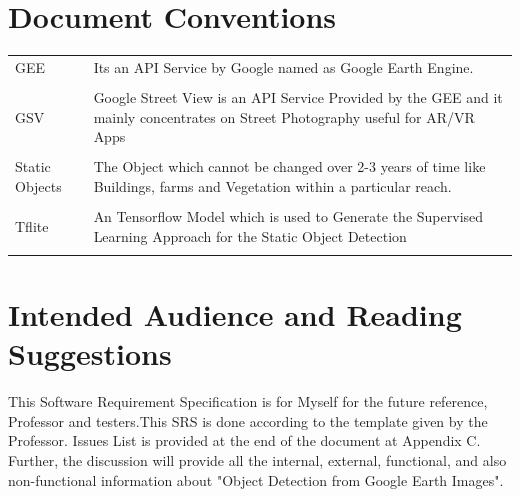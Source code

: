 	
	
	\section{Document Conventions}
	\begin{tabular}{ p{4.5cm} p{8cm} }
		
		
		GEE         &Its an API Service by Google named as Google Earth Engine.\\\\
		GSV         &Google Street View is an API Service Provided by the GEE and it mainly concentrates on Street Photography useful for AR/VR Apps \\\\
		Static Objects  &The Object which cannot be changed over 2-3 years of time like Buildings, farms and Vegetation within a particular reach.\\\\
		Tflite		&An Tensorflow Model which is used to Generate the Supervised Learning Approach for the Static Object Detection\\\\
				
		
		
	\end{tabular}
	
	
	\section{Intended Audience and Reading Suggestions}
	This Software Requirement Specification is for Myself for the future reference, Professor and testers.This SRS is done according to the template given by the Professor. Issues List is provided at the end of the document at Appendix C. Further, the discussion will provide all the internal, external, functional, and also non-functional information about "Object Detection from Google Earth Images". 
	
	
	
	
	
